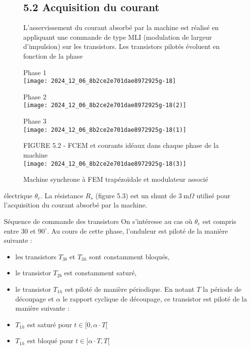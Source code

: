 \begin{figure}[!htb]
\begin{center}
\subsection{5.2 Acquisition du courant}
L'asservissement du courant absorbé par la machine est réalisé en appliquant une commande de type MLI (modulation de largeur d'impulsion) sur les transistors. Les transistors pilotés évoluent en fonction de la phase

Phase 1\\
\texttt{[image: 2024\_12\_06\_8b2ce2e701dae8972925g-18]}

Phase 2\\
\texttt{[image: 2024\_12\_06\_8b2ce2e701dae8972925g-18(2)]}

Phase 3\\
\texttt{[image: 2024\_12\_06\_8b2ce2e701dae8972925g-18(1)]}

FIGURE 5.2 - FCEM et courants idéaux dans chaque phase de la machine\\
\texttt{[image: 2024\_12\_06\_8b2ce2e701dae8972925g-18(3)]}
\caption{Machine synchrone à FEM trapézoïdale et modulateur associé\\ \label{fig13}}
\end{center}
\end{figure}
électrique \(\theta_{e}\). La résistance \(R_{s}\) (figure 5.3) est un shunt de \(3 \mathrm{~m} \Omega\) utilisé pour l'acquisition du courant absorbé par la machine.

Séquence de commande des transistors On s'intéresse au cas où \(\theta_{e}\) est compris entre 30 et \(90^{\circ}\). Au cours de cette phase, l'onduleur est piloté de la manière suivante :

\begin{itemize}
  \item les transistors \(T_{3 b}\) et \(T_{3 h}\) sont constamment bloqués,
  \item le transistor \(T_{2 b}\) est constamment saturé,
  \item le transistor \(T_{1 h}\) est piloté de manière périodique. En notant \(T\) la période de découpage et \(\alpha\) le rapport cyclique de découpage, ce transistor est piloté de la manière suivante :
  \item \(T_{1 h}\) est saturé pour \(t \in[0, \alpha \cdot T[\)
  \item \(T_{1 h}\) est bloqué pour \(t \in[\alpha \cdot T, T[\)
\end{itemize}

